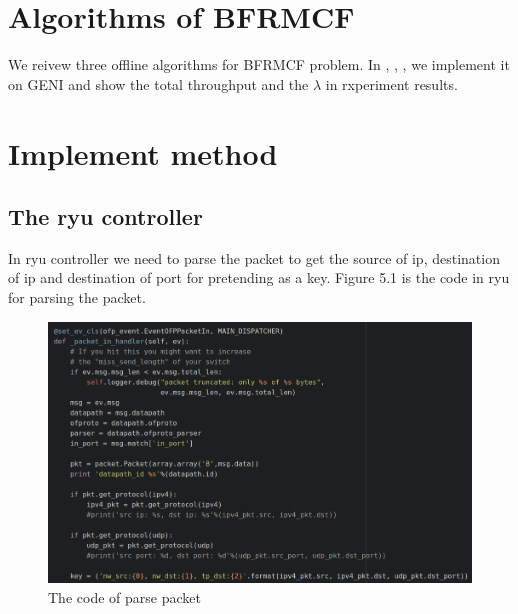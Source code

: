 \documentclass[a4paper,12pt]{report}
\begin{document}
\begin{CJK*}{UTF8}{bkai}
\begin{large}
\section{Algorithms of BFRMCF}
\qquad We reivew three offline algorithms for BFRMCF problem. In \cite{our}, \cite{grag}, \cite{gk}, we implement it on GENI and show the total throughput and the $\lambda$ in rxperiment results.
\section{Implement method}
\subsection{ The ryu controller}
  \qquad In ryu controller we need to parse the packet to get the source of ip, destination of ip and destination of port for pretending as a key. Figure 5.1 is the code in ryu for parsing the packet.
  \begin{figure}[b]
	          \caption{The code of parse packet}
	          \centering
	            \includegraphics[width=1.0\textwidth]{ryu_controller_parse.png}
	      	\end{figure}

\end{large}
\end{CJK*}
\end{document}
